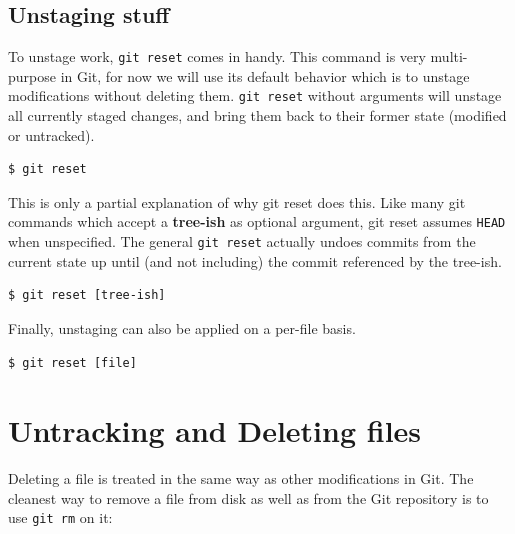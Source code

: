 \documentclass{../common/tufte-latex/tufte-handout}
\begin{document}
\subsection{Unstaging stuff}

To unstage work, \texttt{git reset} comes in handy.
This command is very multi-purpose in Git, for now we will use its default behavior which is to unstage modifications without deleting them.
\texttt{git reset} without arguments will unstage all currently staged changes, and bring them back to their former state (modified or untracked).


\begin{lstlisting}[style=BashInputStyle]
  $ git reset 
\end{lstlisting}

This is only a partial explanation of why git reset does this.
Like many git commands which accept a \textbf{tree-ish} as optional argument, git reset assumes \texttt{HEAD} when unspecified.
The general \texttt{git reset} actually undoes commits from the current state up until (and not including) the commit referenced by the tree-ish.

\begin{lstlisting}[style=BashInputStyle]
  $ git reset [tree-ish]
\end{lstlisting}

Finally, unstaging can also be applied on a per-file basis.

\begin{lstlisting}[style=BashInputStyle]
  $ git reset [file]
\end{lstlisting}

\section{Untracking and Deleting files}

Deleting a file is treated in the same way as other modifications in Git.
The cleanest way to remove a file from disk as well as from the Git repository is to use \texttt{git rm} on it:
\end{document}
